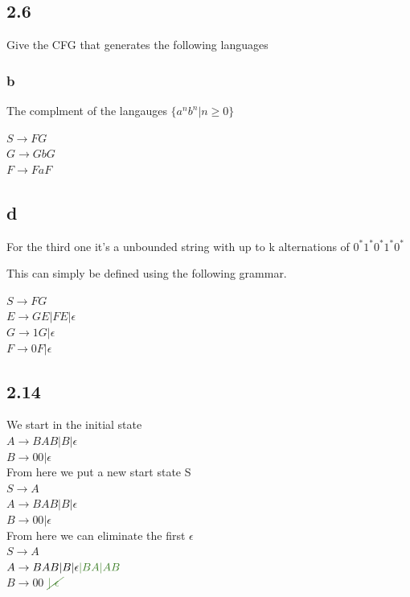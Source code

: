 \documentclass[a4paper,10pt,titlepage]{report}
\begin{document}
\subsection{2.6}
Give the CFG that generates the following languages
\begin{multicols}{2}

\subsubsection{b}
The complment of the langauges $ \{a^nb^n | n \geq 0 \} $

$ S \rightarrow FG $\\
$ G \rightarrow GbG $\\
$ F \rightarrow FaF $

\subsection{d}
For the third one it's a unbounded string with up to k alternations of $0^*1^*0^*1^*0^*$

This can simply be defined using the following grammar.

$ S \rightarrow FG $\\
$ E \rightarrow GE | FE | \epsilon $\\
$ G \rightarrow 1G | \epsilon $\\
$ F \rightarrow 0F | \epsilon $

\end{multicols}


\subsection{2.14}
We start in the initial state \\
$ A \rightarrow BAB | B | \epsilon $\\
$ B \rightarrow 00 | \epsilon $ \\
\vspace{5mm}
From here we put a new start state S\\
\vspace{5mm}
$ S \rightarrow A$\\
$ A \rightarrow BAB | B | \epsilon $\\
$ B \rightarrow 00 | \epsilon $\\
\vspace{5mm}
From here we can eliminate the first $\epsilon$ \\
\vspace{5mm}
$ S \rightarrow A$\\
$ A \rightarrow BAB | B | \epsilon \textcolor{OliveGreen}{|BA|AB}$\\
$ B \rightarrow 00 $ $\textcolor{OliveGreen}{\cancel{ | \ \epsilon \ }}$\\
\end{document}
